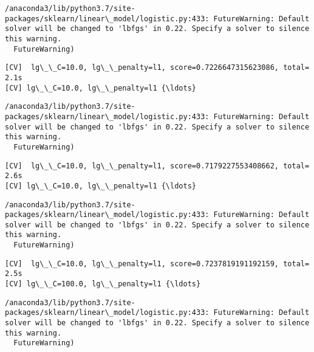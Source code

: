 \documentclass[11pt]{article}
\begin{document}
    \begin{Verbatim}[commandchars=\\\{\}]
/anaconda3/lib/python3.7/site-packages/sklearn/linear\_model/logistic.py:433: FutureWarning: Default solver will be changed to 'lbfgs' in 0.22. Specify a solver to silence this warning.
  FutureWarning)

    \end{Verbatim}

    \begin{Verbatim}[commandchars=\\\{\}]
[CV]  lg\_\_C=10.0, lg\_\_penalty=l1, score=0.7226647315623086, total=   2.1s
[CV] lg\_\_C=10.0, lg\_\_penalty=l1 {\ldots}

    \end{Verbatim}

    \begin{Verbatim}[commandchars=\\\{\}]
/anaconda3/lib/python3.7/site-packages/sklearn/linear\_model/logistic.py:433: FutureWarning: Default solver will be changed to 'lbfgs' in 0.22. Specify a solver to silence this warning.
  FutureWarning)

    \end{Verbatim}

    \begin{Verbatim}[commandchars=\\\{\}]
[CV]  lg\_\_C=10.0, lg\_\_penalty=l1, score=0.7179227553408662, total=   2.6s
[CV] lg\_\_C=10.0, lg\_\_penalty=l1 {\ldots}

    \end{Verbatim}

    \begin{Verbatim}[commandchars=\\\{\}]
/anaconda3/lib/python3.7/site-packages/sklearn/linear\_model/logistic.py:433: FutureWarning: Default solver will be changed to 'lbfgs' in 0.22. Specify a solver to silence this warning.
  FutureWarning)

    \end{Verbatim}

    \begin{Verbatim}[commandchars=\\\{\}]
[CV]  lg\_\_C=10.0, lg\_\_penalty=l1, score=0.7237819191192159, total=   2.5s
[CV] lg\_\_C=100.0, lg\_\_penalty=l1 {\ldots}

    \end{Verbatim}

    \begin{Verbatim}[commandchars=\\\{\}]
/anaconda3/lib/python3.7/site-packages/sklearn/linear\_model/logistic.py:433: FutureWarning: Default solver will be changed to 'lbfgs' in 0.22. Specify a solver to silence this warning.
  FutureWarning)

    \end{Verbatim}
\end{document}

